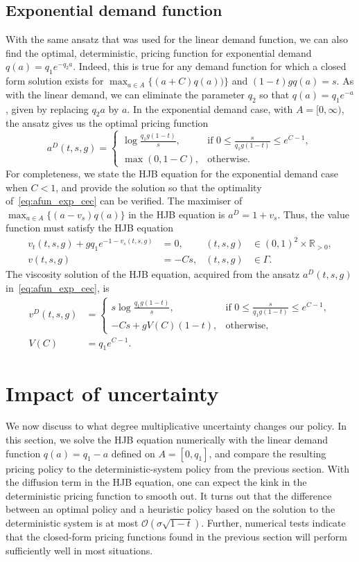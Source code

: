 \documentclass[main.tex]{subfiles}
\begin{document}
\subsection{Exponential demand function}
With the same ansatz that was used for the linear demand function, we
can also find the optimal, deterministic, pricing function for
exponential demand $q(a)=q_1e^{-q_2a}$.
Indeed, this is true for any demand function for which a closed form
solution exists for $\max_{a\in A}\{(a+C)q(a))\}$ and $(1-t)gq(a)=s$.
As with the linear demand, we can eliminate the parameter $q_2$ so that
$q(a)=q_1e^{-a}$, given by replacing $q_2a$ by $a$.
In the exponential demand case, with $A=[0,\infty)$, the ansatz gives
us the optimal pricing function
\begin{equation}\label{eq:afun_exp_cec}
  a^D(t,s,g)=\begin{cases}
    \log{\frac{q_1g(1-t)}{s}},
    &\text{if } 0\leq\frac{s}{q_1g(1-t)}\leq e^{C-1},\\
    \max\left(0,1-C\right),&\text{otherwise}.
  \end{cases}
\end{equation}
For completeness, we state the HJB equation for the exponential demand
case when $C<1$, and provide the solution so that the optimality of~\eqref{eq:afun_exp_cec} can
be verified. The maximiser of $\max_{a\in A}\{(a-v_s)q(a)\}$ in the
HJB equation is $a^D =  1+v_s$. Thus, the value function
must satisfy the HJB equation
\begin{align}
  v_t(t,s,g)
  +gq_1e^{-1-v_s(t,s,g)}
  &=0,&(t,s,g)&\in{(0,1)}^2\times \mathbb R_{>0},\\
  v(t,s,g) &= -Cs,&(t,s,g)&\in \Gamma.
\end{align}
The viscosity solution of the HJB equation, acquired from the ansatz $a^D(t,s,g)$
in~\eqref{eq:afun_exp_cec}, is
\begin{align}
  v^D(t,s,g)
  &=\begin{cases}
    s \log \frac{q_1g(1-t)}{s},
    &\text{if } 0\leq \frac{s}{q_1g(1-t)}\leq e^{C-1},\\
    -Cs+gV(C)(1-t),&\text{otherwise},
  \end{cases}\\
  V(C)&=q_1e^{C-1}.
\end{align}

\section{Impact of uncertainty}\label{sec:stochastic_hjb}
We now discuss to what degree multiplicative uncertainty changes
our policy. In this section, we solve the HJB equation numerically with the linear
demand function $q(a)=q_1-a$ defined on $A=[0,q_1]$, and compare the
resulting pricing policy to the
deterministic-system policy from the previous section.
With the diffusion term in the HJB equation, one can
expect the kink in the deterministic pricing function to smooth
out. It turns out that the difference between an optimal
policy and a heuristic policy based on the solution
to the deterministic system is at most
$\mathcal{O}(\sigma \sqrt{1-t})$. Further, numerical tests indicate that the
closed-form pricing functions found in the previous section will
perform sufficiently well in most situations.
\end{document}
